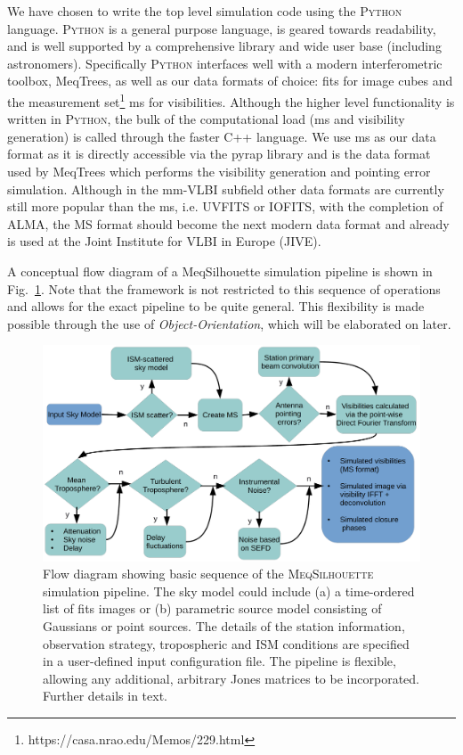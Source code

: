 We have chosen to write the top level simulation code using the \textsc{Python} language. \textsc{Python} is a general purpose language, is geared towards readability, and is well supported by a comprehensive library and wide user base (including astronomers). Specifically \textsc{Python} interfaces well with a modern interferometric toolbox, {\sc MeqTrees}, as well as our data formats of choice: {\sc fits} for image cubes and the {\sc measurement set}\footnote{https://casa.nrao.edu/Memos/229.html} {\sc ms} for visibilities. Although the higher level functionality is written in \textsc{Python}, the bulk of the computational load ({\sc ms} and visibility generation) is called through the faster {\sc C++} language. 
We use {\sc ms} as our data format as it is directly accessible via the {\sc pyrap} library and is the data format used by {\sc MeqTrees} which performs the visibility generation and pointing error simulation. Although in the mm-VLBI subfield other data formats are currently still more popular than the {\sc ms}, i.e. {\sc UVFITS} or {\sc IOFITS}, with the completion of ALMA, the MS format should become the next modern data format and already is used at the Joint Institute for VLBI in Europe (JIVE). 



A conceptual flow diagram of a {\sc MeqSilhouette} simulation pipeline is shown in Fig.~\ref{flow}. Note that the framework is not restricted to this sequence of operations and allows for the exact pipeline to be quite general. This flexibility is made possible through the use of \emph{Object-Orientation}, which will be elaborated on later.

\begin{figure}
\begin{center}
\includegraphics[width=\columnwidth]{Images/flow_full}
\caption{Flow diagram showing basic sequence of the \textsc{MeqSilhouette} simulation pipeline. The sky model could include (a) a time-ordered list of {\sc fits} images or (b) parametric source model consisting of Gaussians or point sources. The details of the station information, observation strategy, tropospheric and ISM conditions are specified in a user-defined input configuration file. The pipeline is flexible, allowing any additional, arbitrary Jones matrices to be incorporated. Further details in text.\label{flow}%
}
\end{center}
\end{figure}


